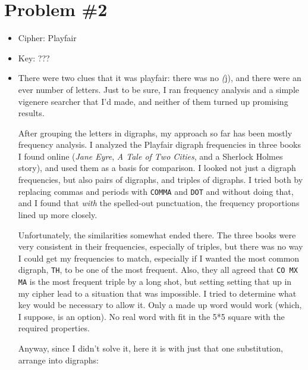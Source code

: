 \documentclass[conference]{IEEEtran}
\begin{document}
\section{Problem \#2}
\begin{itemize}
  \item Cipher: Playfair 
  \item Key: ??? 
  \item There were two clues that it was playfair: there was no \textit(j), and
    there were an ever number of letters. Just to be sure, I ran frequency
    analysis and a simple vigenere searcher that I'd made, and neither of them
    turned up promising results.

    After grouping the letters in digraphs, my approach so far has been
    mostly frequency analysis. I analyzed the Playfair digraph frequencies
    in three books I found online (\textit{Jane Eyre}, \textit{A Tale of Two
      Cities}, and a Sherlock Holmes story), and used them as a basis for
    comparison. I looked not just a digraph frequencies, but also pairs of
    digraphs, and triples of digraphs. I tried both by replacing commas and periods with
    \verb|COMMA| and \verb|DOT| and without doing that, and I found that
    \emph{with} the spelled-out punctuation, the frequency proportions lined up
    more closely. 

    Unfortunately, the similarities somewhat ended there. The three books
    were very consistent in their frequencies, especially of triples, but there
    was no way I could get my frequencies to match, especially if I wanted the
    most common digraph, \verb|TH|, to be one of the most frequent. Also, they
    all agreed that \verb|CO MX MA| is the most frequent triple by a long shot,
    but setting setting that up in my cipher lead to a situation that was impossible.
    I tried to determine what key would be necessary to allow it. Only a made up
    word would work (which, I suppose, is an option). No real word with fit in the
    5*5 square with the required properties.

    Anyway, since I didn't solve it, here it is with just that one substitution,
    arrange into digraphs:


\end{itemize}
\end{document}
